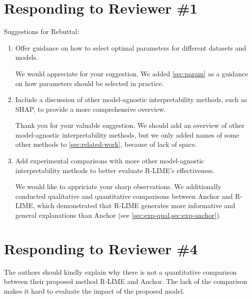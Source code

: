 \documentclass[runningheads]{llncs}
\begin{document}
\section*{Responding to Reviewer \#1}
Suggestions for Rebuttal:
\begin{enumerate}
  \setlength{\itemsep}{15pt}
  \item Offer guidance on how to select optimal parameters for different
        datasets and models.

        \begin{mycomment}
          We would appreciate for your suggestion.
          We added \cref{sec:param} as a guidance on how parameters should be
          selected in practice.
        \end{mycomment}

  \item Include a discussion of other model-agnostic interpretability methods,
        such as SHAP, to provide a more comprehensive overview.

        \begin{mycomment}
          Thank you for your valuable suggestion.
          We should add an overview of other model-agnostic interpretability
          methods, but we only added names of some other methods to
          \cref{sec:related-work}, because of lack of space.
        \end{mycomment}

  \item Add experimental comparisons with more other model-agnostic \\
        interpretability methods to better evaluate R-LIME's effectiveness.

        \begin{mycomment}
          We would like to appriciate your sharp observations.
          We additionally conducted qualitative and quantitative comparisons
          between Anchor and R-LIME,
          which demonstrated that R-LIME generates more informative and
          general explanations than Anchor (see \cref{sec:exp-qual,sec:exp-anchor}).
        \end{mycomment}
\end{enumerate}
\section*{Responding to Reviewer \#4}
The authors should kindly explain why there is not a quantitative comparison
between their proposed method R-LIME and Anchor. The lack of the comparison
makes it hard to evaluate the impact of the proposed model.
\end{document}

